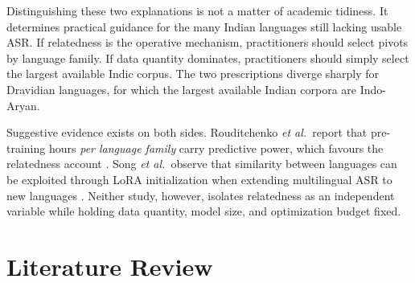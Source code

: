 \documentclass[conference]{IEEEtran}
\begin{document}
Distinguishing these two explanations is not a matter of academic
tidiness. It determines practical guidance for the many Indian languages
still lacking usable ASR. If relatedness is the operative mechanism,
practitioners should select pivots by language family. If data quantity
dominates, practitioners should simply select the largest available
Indic corpus. The two prescriptions diverge sharply for Dravidian
languages, for which the largest available Indian corpora are
Indo-Aryan.

Suggestive evidence exists on both sides. Rouditchenko \emph{et al.}\
report that pre-training hours \emph{per language family} carry
predictive power, which favours the relatedness account
\cite{rouditchenko2023unseen}. Song \emph{et al.}\ observe that
similarity between languages can be exploited through LoRA
initialization when extending multilingual ASR to new languages
\cite{song2024lorawhisper}. Neither study, however, isolates relatedness
as an independent variable while holding data quantity, model size, and
optimization budget fixed.

\section{Literature Review}
\end{document}
